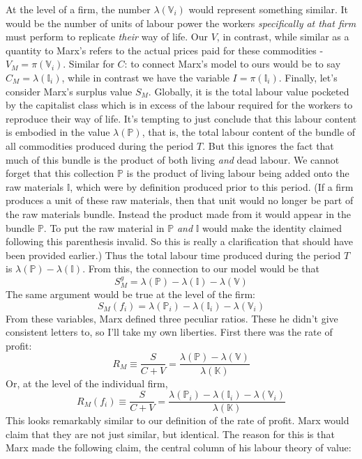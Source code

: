 At the level of a firm, the number $\lambda(\mathbb{V}_i)$ would represent something similar. It would be the number of units of labour power the workers \textit{specifically at that firm} must perform to replicate \textit{their} way of life. Our $V$, in contrast, while similar as a quantity to Marx's refers to the actual prices paid for these commodities - $V_M = \pi(\mathbb{V}_i)$. Similar for $C$: to connect Marx's model to ours would be to say $C_M = \lambda(\mathbb{I}_i)$, while in contrast we have the variable $I = \pi(\mathbb{I}_i)$. Finally, let's consider Marx's surplus value $S_M$. Globally, it is the total labour value pocketed by the capitalist class which is in excess of the labour required for the workers to reproduce their way of life. It's tempting to just conclude that this labour content is embodied in the value $\lambda(\mathbb{P})$, that is, the total labour content of the bundle of all commodities produced during the period $T$. But this ignores the fact that much of this bundle is the product of both living \textit{and} dead labour. We cannot forget that this collection $\mathbb{P}$ is the product of living labour being added onto the raw materials $\mathbb{I}$, which were by definition produced prior to this period. (If a firm produces a unit of these raw materials, then that unit would no longer be part of the raw materials bundle. Instead the product made from it would appear in the bundle $\mathbb{P}$. To put the raw material in $\mathbb{P}$ \textit{and} $\mathbb{I}$ would make the identity claimed following this parenthesis invalid. So this is really a clarification that should have been provided earlier.) Thus the total labour time produced during the period $T$ is $\lambda(\mathbb{P})-\lambda(\mathbb{I})$. From this, the connection to our model would be that 
\[ S_M^g = \lambda(\mathbb{P})- \lambda(\mathbb{I}) - \lambda(\mathbb{V}) \]
The same argument would be true at the level of the firm: 
\[S_M(f_i) = \lambda(\mathbb{P}_i)- \lambda(\mathbb{I}_i) - \lambda(\mathbb{V}_i) \]
From these variables, Marx defined three peculiar ratios. These he didn't give consistent letters to, so I'll take my own liberties. First there was the rate of profit:
\[ R_M \equiv \frac{S}{C+V} = \frac{\lambda(\mathbb{P})-\lambda(\mathbb{V})}{\lambda(\mathbb{K})} \]
Or, at the level of the individual firm,
\[ R_M(f_i) \equiv \frac{S}{C+V} = \frac{\lambda(\mathbb{P}_i)-\lambda(\mathbb{I}_i) - \lambda(\mathbb{V}_i)}{\lambda(\mathbb{K})} \]
This looks remarkably similar to our definition of the rate of profit. Marx would claim that they are not just similar, but identical. The reason for this is that Marx made the following claim, the central column of his labour theory of value:
